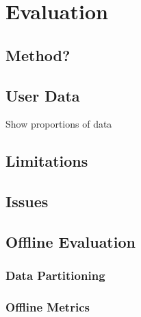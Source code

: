 \chapter{Evaluation}\label{C:evaluation}

\section{Method?}

\section{User Data}



Show proportions of data

\section{Limitations}

\section{Issues}

\section{Offline Evaluation}

\subsection{Data Partitioning}

\subsection{Offline Metrics}

